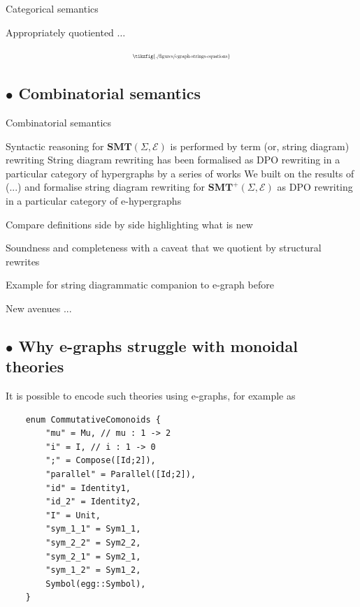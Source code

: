\documentclass[aspectratio=169]{beamer}
\newcommand{\bsubsection}[1]{\subsection{$\bullet$ #1}}
\begin{document}
\begin{frame}{Categorical semantics}

Appropriately quotiented $\ldots$

\[
\scalebox{0.5}{
\tikzfig{./figures/egraph-strings-equations}
}
\]

\end{frame}

\bsubsection{Combinatorial semantics}

\begin{frame}{Combinatorial semantics}

Syntactic reasoning for $\mathbf{SMT}(\Sigma, \mathcal{E})$ is performed by term (or, string diagram) rewriting
\vfill
String diagram rewriting has been formalised as DPO rewriting in a particular category of hypergraphs by a series of works
\vfill
We built on the results of (...) and formalise string diagram rewriting for $\mathbf{SMT}^{+}(\Sigma, \mathcal{E})$ as DPO rewriting in a particular category of \alert{e-hypergraphs}
\end{frame}

\begin{frame}
Compare definitions side by side highlighting what is new
\end{frame}

\begin{frame}
    Soundness and completeness with a caveat that we quotient by structural rewrites
\end{frame}

\begin{frame}
Example for string diagrammatic companion to e-graph before
\end{frame}

\begin{frame}
New avenues ...
\end{frame}

\bsubsection{Why e-graphs struggle with monoidal theories}

\begin{frame}[containsverbatim]{}

It is possible to encode such theories using e-graphs, for example as

\begin{verbatim}
    enum CommutativeComonoids {
        "mu" = Mu, // mu : 1 -> 2
        "i" = I, // i : 1 -> 0
        ";" = Compose([Id;2]),
        "parallel" = Parallel([Id;2]),
        "id" = Identity1,
        "id_2" = Identity2,
        "I" = Unit,
        "sym_1_1" = Sym1_1,
        "sym_2_2" = Sym2_2,
        "sym_2_1" = Sym2_1,
        "sym_1_2" = Sym1_2,
        Symbol(egg::Symbol),
    }
\end{verbatim}

\end{frame}
\end{document}
